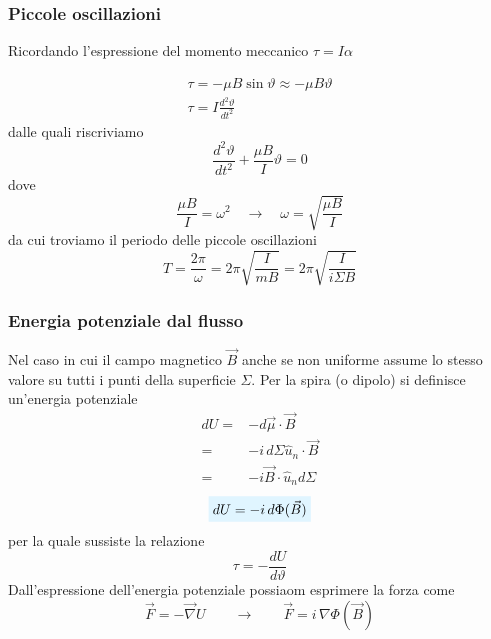 \documentclass[x11names]{report}
\begin{document}
\subsubsection{Piccole oscillazioni}
Ricordando l'espressione del momento meccanico \(\tau = I\alpha\) 

\begin{gather}
	\tau = -\mu B \sin\vartheta \approx -\mu B \vartheta \\
	\tau = I\frac{d^2\vartheta}{dt^2}
\end{gather}
dalle quali riscriviamo
\[
\frac{d^2\vartheta}{dt^2} + \frac{\mu B}{I} \vartheta = 0
\]
dove
\[
\frac{\mu B}{I} = \omega^2 \quad \to \quad \omega = \sqrt{\frac{\mu B}{I}}
\]
da cui troviamo il periodo delle piccole oscillazioni
\[
T = \frac{2\pi}{\omega} = 2\pi \sqrt{\frac{I}{mB}} = 2\pi \sqrt{\frac{I}{i\Sigma B}}
\]

\subsubsection{Energia potenziale dal flusso}
Nel caso in cui il campo magnetico \(\vec{B}\) anche se non uniforme assume lo stesso valore su tutti i punti della superficie \(\Sigma\). Per la spira (o dipolo) si definisce un'energia potenziale
\begin{align*}
	dU =& -d\vec{\mu}\cdot\vec{B} \\
	=& -i \, d\Sigma \hat{u}_n \cdot \vec{B} \\
	=& -i\vec{B}\cdot \hat{u}_n  d\Sigma
\end{align*}
\begin{equation}
	\viola{dU =-i \, d\Phi(\vec{B})}
\end{equation}
per la quale sussiste la relazione
\[
\tau= - \frac{dU}{d\vartheta}
\]
Dall'espressione dell'energia potenziale possiaom esprimere la forza come 
\[
\vec{F} = -\vec{\nabla} U \qquad  \to \qquad \vec{F} = i \, \nabla\Phi(\vec{B})
\]
\end{document}
